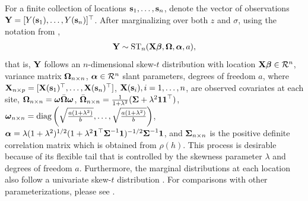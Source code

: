 \documentclass[useAMS,usenatbib,referee]{biom}
\begin{document}
For a finite collection of locations $\mbox{\bf s}_1, \ldots, \mbox{\bf s}_n$, denote the vector of observations $\mbox{\bf Y} = [Y(\mbox{\bf s}_1), \ldots, Y(\mbox{\bf s}_n)]^\top$.
After marginalizing over both $z$ and $\sigma$, using the notation from \citet[p. 176]{Azzalini2014},
\begin{align} \label{steq:stazzalini}
  \bY \sim \text{ST}_n(\bX \bbeta, \bOmega, \balpha, a),
\end{align}
that is, $\mbox{\bf Y}$ follows an $n$-dimensional skew-$t$ distribution with location $\bX \bbeta \in \calR^n$, variance matrix $\mbox{\boldmath $\Omega$}_{n \times n}$, $\balpha \in \calR^n$ slant parameters, degrees of freedom $a$, where $\mbox{\bf X}_{n \times p} = [\mbox{\bf X}(\mbox{\bf s}_1)^\top, \ldots, \mbox{\bf X}(\mbox{\bf s}_n)^\top]$,
$\mbox{\bf X}(\mbox{\bf s}_i), i = 1, \ldots, n$, are observed covariates at each site,
$\mbox{\boldmath $\Omega$}_{n \times n} = \mbox{\boldmath $\omega$} \bar{\mbox{\boldmath $\Omega$}} \mbox{\boldmath $\omega$}$,
$\bar{\mbox{\boldmath $\Omega$}}_{n \times n} = \frac{1}{1 + \lambda^2}(\mbox{\boldmath $\Sigma$} + \lambda^2 \mbox{\boldmath $1$} \mbox{\boldmath $1$}^\top)$,
$\mbox{\boldmath $\omega$}_{n \times n} = \text{diag}\left(\sqrt{\frac{a(1 + \lambda^2)}{ b }}, \ldots, \sqrt{\frac{a(1 + \lambda^2)}{ b }} \right)$,
$\mbox{\boldmath $\alpha$} = \lambda (1 + \lambda^2)^{1 / 2} (1 + \lambda^2 \mbox{\boldmath $1$}^\top \mbox{\boldmath $\Sigma$}^{-1} \mbox{\boldmath $1$})^{-1/2} \mbox{\boldmath $\Sigma$}^{-1} \mbox{\boldmath $1$}$, and $\mbox{\boldmath $\Sigma$}_{n \times n}$ is the positive definite correlation matrix which is obtained from $\rho(h)$.
This process is desirable because of its flexible tail that is controlled by the skewness parameter $\lambda$ and degrees of freedom $a$.
Furthermore, the marginal distributions at each location also follow a univariate skew-$t$ distribution \citep{Azzalini2014}.
For comparisons with other parameterizations, please see .


\end{document}
